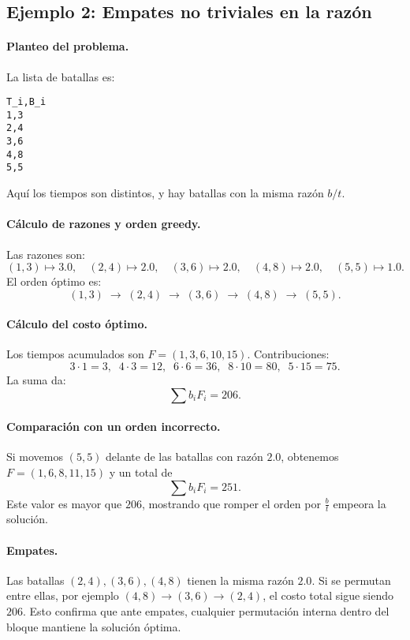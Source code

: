 \subsection{Ejemplo 2: Empates no triviales en la razón}

\paragraph{Planteo del problema.}  
La lista de batallas es:
\begin{verbatim}
T_i,B_i
1,3
2,4
3,6
4,8
5,5
\end{verbatim}
Aquí los tiempos son distintos, y hay batallas con la misma razón $b/t$.

\paragraph{Cálculo de razones y orden greedy.}  
Las razones son:
\[
(1,3)\mapsto 3.0,\quad (2,4)\mapsto 2.0,\quad (3,6)\mapsto 2.0,\quad (4,8)\mapsto 2.0,\quad (5,5)\mapsto 1.0.
\]
El orden óptimo es:
\[
(1,3)\;\to\;(2,4)\;\to\;(3,6)\;\to\;(4,8)\;\to\;(5,5).
\]

\paragraph{Cálculo del costo óptimo.}  
Los tiempos acumulados son $F=(1,3,6,10,15)$.  
Contribuciones:
\[
3\cdot1=3,\;\;4\cdot3=12,\;\;6\cdot6=36,\;\;8\cdot10=80,\;\;5\cdot15=75.
\]
La suma da:
\[
\sum b_i F_i = \boxed{206}.
\]

\paragraph{Comparación con un orden incorrecto.}  
Si movemos $(5,5)$ delante de las batallas con razón $2.0$, obtenemos $F=(1,6,8,11,15)$ y un total de
\[
\sum b_i F_i = 251.
\]
Este valor es mayor que $206$, mostrando que romper el orden por $\tfrac{b}{t}$ empeora la solución.

\paragraph{Empates.}  
Las batallas $(2,4),(3,6),(4,8)$ tienen la misma razón $2.0$.  
Si se permutan entre ellas, por ejemplo $(4,8)\to(3,6)\to(2,4)$, el costo total sigue siendo $206$.  
Esto confirma que ante empates, cualquier permutación interna dentro del bloque mantiene la solución óptima.
